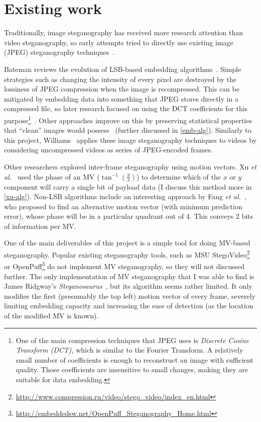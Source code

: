 \documentclass[12pt,british,twoside,notitlepage,usenames,dvipsnames,hypens,final]{report}
\numberwithin{equation}{section}
\numberwithin{figure}{section}
\begin{document}
\section{Existing work}

Traditionally, image steganography has received more research attention than video steganography, so early attempts tried to directly use existing image (JPEG) steganography techniques~\cite{bateman, jpegdctcoding}.

Bateman reviews the evolution of LSB-based embedding algorithms~\cite{bateman}. Simple strategies such as changing the intensity of every pixel are destroyed by the lossiness of JPEG compression when the image is recompressed. This can be mitigated by embedding data into something that JPEG stores directly in a compressed file, so later research focused on using the DCT coefficients for this purpose\footnote{
One of the main compression techniques that JPEG uses is \emph{Discrete Cosine Transform (DCT)}, which is similar to the Fourier Transform. A relatively small number of coefficients is enough to reconstruct an image with sufficient quality. Those coefficients are insensitive to small changes, making they are suitable for data embedding.}~\cite{jpegdctcoding}. Other approaches improve on this by preserving statistical properties that ``clean'' images would possess~\cite{bateman, f5} (further discussed in \ref{emb-alg}). Similarly to this project, Williams~\cite{scott-fs} applies these image steganography techniques to videos by considering uncompressed videos as series of JPEG-encoded frames.

Other researchers explored inter-frame steganography using motion vectors. Xu \emph{et al.}~\cite{xu2006steganography} used the phase of an MV ($\tan^{-1}(\frac{y}{x})$) to determine which of the $x$ or $y$ component will carry a single bit of payload data (I discuss this method more in \ref{xu-alg}). Non-LSB algorithms include an interesting approach by Fang \emph{et al.}~\cite{fang2006data}, who proposed to find an alternative motion vector (with minimum prediction error), whose phase will be in a particular quadrant out of 4. This conveys 2 bits of information per MV.

One of the main deliverables of this project is a simple tool for doing MV-based steganography. Popular existing steganography tools, such as MSU StegoVideo\footnote{\url{http://www.compression.ru/video/stego_video/index_en.html}} or OpenPuff\footnote{\url{http://embeddedsw.net/OpenPuff_Steganography_Home.html}} do not implement MV steganography, so they will not discussed further. The only implementation of MV steganography that I was able to find is James Ridgway's \emph{Steganosaurus}~\cite{steganosaurus}, but its algorithm seems rather limited. It only modifies the first (presumably the top left) motion vector of every frame, severely limiting embedding capacity and increasing the ease of detection (as the location of the modified MV is known).
\end{document}
